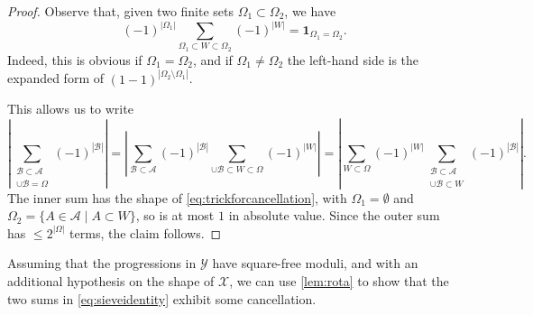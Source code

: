 \documentclass[11pt]{amsart}
\theoremstyle{definition}
\renewcommand{\leq}{\leqslant}
\newcommand{\abs}[1]{\left|#1\right|}
\newcommand{\ind}[1]{\mathbf{1}_{#1}}
\newcommand{\prohibprog}{\mathcal{Y}}
\newcommand{\appendixsubcoll}{\mathcal{X}}
\begin{document}
\begin{proof}
Observe that, given two finite sets $\Omega_1\subset \Omega_2$, we have
\begin{equation}
\label{eq:trickforcancellation}
(-1)^{|\Omega_1|} \sum_{\Omega_1 \subset W \subset \Omega_2} (-1)^{|W|} = \ind{\Omega_1=\Omega_2}.
\end{equation}
Indeed, this is obvious if $\Omega_1 = \Omega_2$, and if $\Omega_1\neq \Omega_2$ the left-hand side is the expanded form of $(1-1)^{|\Omega_2\setminus \Omega_1|}$. 

This allows us to write
\begin{equation*}
\abs{\sum_{\substack{\mathcal{B} \subset \mathcal{A}\\ \cup \mathcal{B} = \Omega}} (-1)^{|\mathcal{B}|} } = \abs{\sum_{\mathcal{B} \subset \mathcal{A} } (-1)^{|\mathcal{B}|} \sum_{\cup \mathcal{B} \subset W \subset \Omega} (-1)^{|W|} } = \abs{\sum_{W\subset \Omega } (-1)^{|W|} \sum_{\substack{\mathcal{B} \subset \mathcal{A}\\ \cup \mathcal{B} \subset W}} (-1)^{|\mathcal{B}|} }.
\end{equation*}
The inner sum has the shape of \cref{eq:trickforcancellation}, with $\Omega_1 = \emptyset$ and $\Omega_2 = \{A\in \mathcal{A} \mid A\subset W\}$, so is at most $1$ in absolute value. Since the outer sum has $\leq 2^{|\Omega|}$ terms, the claim follows.
\end{proof}

Assuming that the progressions in $\prohibprog$ have square-free moduli, and with an additional hypothesis on the shape of $\appendixsubcoll$, we can use \cref{lem:rota} to show that the two sums in \cref{eq:sieveidentity} exhibit some cancellation.
\end{document}
